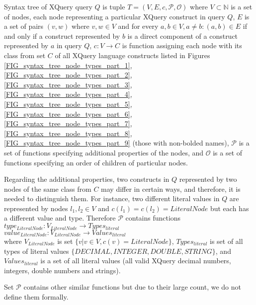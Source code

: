 \begin{define}
Syntax tree of XQuery query $Q$ is tuple $T = (V, E, c, \mathcal{P}, \mathcal{O})$ where $V \subset \mathbb{N}$ is a set of nodes, each node representing a particular XQuery construct in query $Q$, $E$ is a set of pairs $(v, w)$ where $v,w \in V$ and for every $a, b \in V, a \neq b: (a, b) \in E$ if and only if a construct represented by $b$ is a direct component of a construct represented by $a$ in query $Q$, $c: V \rightarrow C$ is function assigning each node with its class from set $C$ of all XQuery language constructs listed in Figures \ref{FIG_syntax_tree_node_types_part_1}, \ref{FIG_syntax_tree_node_types_part_2}, \ref{FIG_syntax_tree_node_types_part_3}, \ref{FIG_syntax_tree_node_types_part_4}, \ref{FIG_syntax_tree_node_types_part_5}, \ref{FIG_syntax_tree_node_types_part_6}, \ref{FIG_syntax_tree_node_types_part_7}, \ref{FIG_syntax_tree_node_types_part_8}, \ref{FIG_syntax_tree_node_types_part_9} (those with non-bolded names), $\mathcal{P}$ is a set of functions specifying additional properties of the nodes, and $\mathcal{O}$ is a set of functions specifying an order of children of particular nodes.
\end{define}

Regarding the additional properties, two constructs in $Q$ represented by two nodes of the same class from $C$ may differ in certain ways, and therefore, it is needed to distinguish them. For instance, two different literal values in $Q$ are represented by nodes $l_1, l_2 \in V$ and $c(l_1) = c(l_2) = LiteralNode$ but each has a different value and type. Therefore $\mathcal{P}$ contains functions \\
$type_{LiteralNode}: V_{LiteralNode} \rightarrow Types_{literal}$ \\
$value_{LiteralNode}: V_{LiteralNode} \rightarrow Values_{literal}$ \\
where $V_{LiteralNode}$ is set $\{v | v \in V, c(v) = LiteralNode\}$, $Types_{literal}$ is set of all types of literal values $\{DECIMAL, INTEGER, DOUBLE, STRING\}$, and $Values_{literal}$ is a set of all literal values (all valid XQuery decimal numbers, integers, double numbers and strings).

Set $\mathcal{P}$ contains other similar functions but due to their large count, we do not define them formally.

